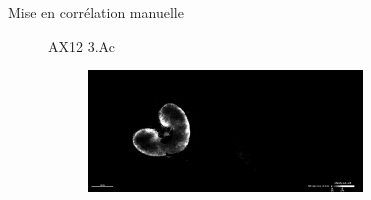 \documentclass[10pt]{beamer}
\begin{document}
\begin{frame}{Mise en corrélation manuelle}
\begin{figure}[ht]
    AX12 3.Ac
    \begin{subfigure}[c]{0.66\textwidth}
      \centering
      \includegraphics[width=0.8\textwidth]{fig/manualcorr_msi_250650_ac}
      \caption{}
      \label{subfig:manualcorr_msi_250650_ac}
    \end{subfigure}%
  \end{figure}
\end{frame}
\end{document}

